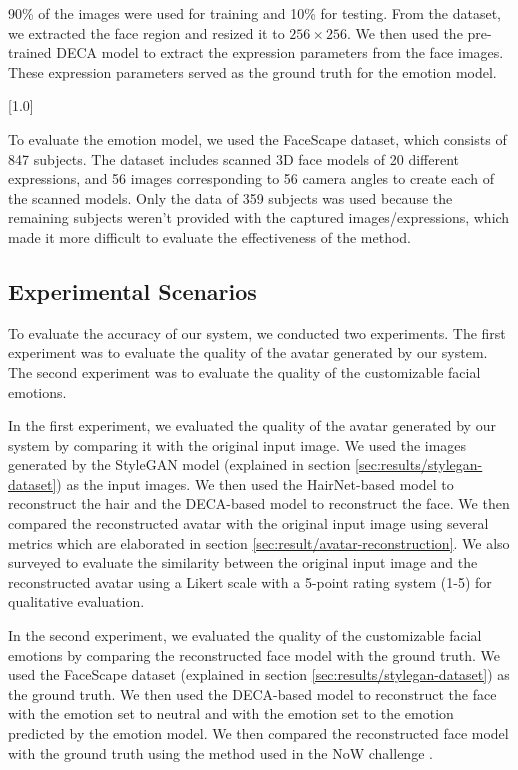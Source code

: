 90\% of the images were used for training and 10\% for testing. From the dataset, we extracted the face region and resized it to $256\times256$. We then used the pre-trained DECA model to extract the expression parameters from the face images. These expression parameters served as the ground truth for the emotion model.

[1.0]

To evaluate the emotion model, we used the FaceScape dataset, which consists of 847 subjects. The dataset includes scanned 3D face models of 20 different expressions, and 56 images corresponding to 56 camera angles to create each of the scanned models. Only the data of 359 subjects was used because the remaining subjects weren't provided with the captured images/expressions, which made it more difficult to evaluate the effectiveness of the method.


\subsection{Experimental Scenarios}
To evaluate the accuracy of our system, we conducted two experiments. The first experiment was to evaluate the quality of the avatar generated by our system. The second experiment was to evaluate the quality of the customizable facial emotions.

In the first experiment, we evaluated the quality of the avatar generated by our system by comparing it with the original input image. We used the images generated by the StyleGAN model (explained in section \ref{sec:results/stylegan-dataset}) as the input images. We then used the HairNet-based model to reconstruct the hair and the DECA-based model to reconstruct the face. We then compared the reconstructed avatar with the original input image using several metrics which are elaborated in section \ref{sec:result/avatar-reconstruction}. We also surveyed to evaluate the similarity between the original input image and the reconstructed avatar using a Likert scale with a 5-point rating system (1-5) for qualitative evaluation.

In the second experiment, we evaluated the quality of the customizable facial emotions by comparing the reconstructed face model with the ground truth. We used the FaceScape dataset (explained in section \ref{sec:results/stylegan-dataset}) as the ground truth. We then used the DECA-based model to reconstruct the face with the emotion set to neutral and with the emotion set to the emotion predicted by the emotion model. We then compared the reconstructed face model with the ground truth using the method used in the NoW challenge \cite{RingNet:CVPR:2019}.



